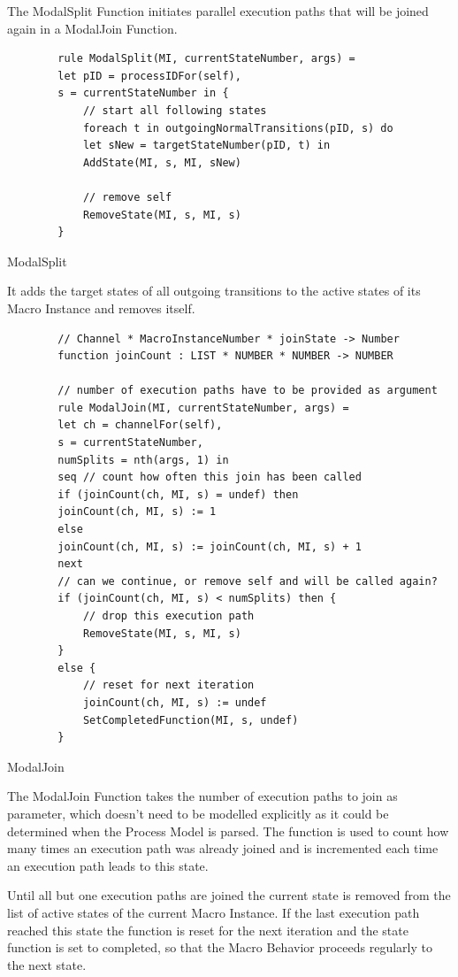 The ModalSplit Function initiates parallel execution paths that will be joined
again in a ModalJoin Function.

\begin{listing}[H]
	\begin{verbatim}
		rule ModalSplit(MI, currentStateNumber, args) =
		let pID = processIDFor(self),
		s = currentStateNumber in {
			// start all following states
			foreach t in outgoingNormalTransitions(pID, s) do
			let sNew = targetStateNumber(pID, t) in
			AddState(MI, s, MI, sNew)
			
			// remove self
			RemoveState(MI, s, MI, s)
		}
	\end{verbatim}
	\caption{ModalSplit}
	\label{lst:shortasm:ModalSplit}
\end{listing}

It adds the target states of all outgoing transitions to the active states of its
Macro Instance and removes itself.

\begin{listing}[H]
	\begin{verbatim}
		// Channel * MacroInstanceNumber * joinState -> Number
		function joinCount : LIST * NUMBER * NUMBER -> NUMBER
		
		// number of execution paths have to be provided as argument
		rule ModalJoin(MI, currentStateNumber, args) =
		let ch = channelFor(self),
		s = currentStateNumber,
		numSplits = nth(args, 1) in
		seq // count how often this join has been called
		if (joinCount(ch, MI, s) = undef) then
		joinCount(ch, MI, s) := 1
		else
		joinCount(ch, MI, s) := joinCount(ch, MI, s) + 1
		next
		// can we continue, or remove self and will be called again?
		if (joinCount(ch, MI, s) < numSplits) then {
			// drop this execution path
			RemoveState(MI, s, MI, s)
		}
		else {
			// reset for next iteration
			joinCount(ch, MI, s) := undef
			SetCompletedFunction(MI, s, undef)
		}
	\end{verbatim}
	\caption{ModalJoin}
	\label{lst:shortasm:ModalJoin}
\end{listing}

The ModalJoin Function takes the number of execution paths to join as parameter,
which doesn't need to be modelled explicitly as it could be determined when the Process Model is parsed.
The  function is used to count how
many times an execution path was already joined and is incremented each time an
execution path leads to this state.

Until all but one execution paths are joined the current state is removed
from the list of active states of the current Macro Instance. If the last
execution path reached this state the  function is reset for the next
iteration and the state function is set to completed, so that the Macro Behavior proceeds
regularly to the next state.

